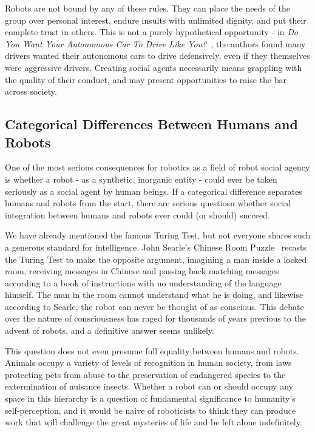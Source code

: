 \documentclass{sfuthesis}
\begin{document}
Robots are not bound by any of these rules. They can place the needs of the group over personal interest, endure insults with unlimited dignity, and put their complete trust in others. This is not a purely hypothetical opportunity - in \textit{Do You Want Your Autonomous Car To Drive Like You?}~\cite{basu2017you}, the authors found many drivers wanted their autonomous cars to drive defensively, even if they themselves were aggressive drivers. Creating social agents necessarily means grappling with the quality of their conduct, and may present opportunities to raise the bar across society.

\subsection{Categorical Differences Between Humans and Robots}

One of the most serious consequences for robotics as a field of robot social agency is whether a robot - as a synthetic, inorganic entity - could ever be taken seriously as a social agent by human beings. If a categorical difference separates humans and robots from the start, there are serious questiosn whether social integration between humans and robots ever could (or should) succeed.

We have already mentioned the famous Turing Test, but not everyone shares such a generous standard for intelligence. John Searle's Chinese Room Puzzle~\cite{searle1990brain} recasts the Turing Test to make the opposite argument, imagining a man inside a locked room, receiving messages in Chinese and passing back matching messages according to a book of instructions with no understanding of the language himself. The man in the room cannot understand what he is doing, and likewise according to Searle, the robot can never be thought of as conscious. This debate over the nature of consciousness has raged for thousands of years previous to the advent of robots, and a definitive answer seems unlikely.

This question does not even presume full equality between humans and robots. Animals occupy a variety of levels of recognition in human society, from laws protecting pets from abuse to the preservation of endangered species to the extermination of nuisance insects. Whether a robot can or should occupy any space in this hierarchy is a question of fundamental significance to humanity's self-perception, and it would be naive of roboticists to think they can produce work that will challenge the great mysteries of life and be left alone indefinitely.
\end{document}
